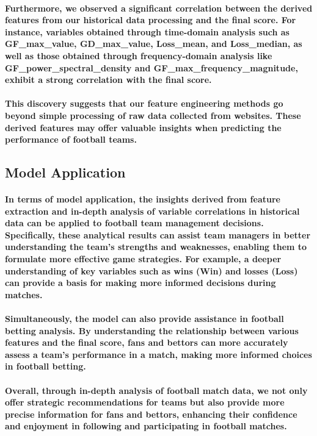 \paragraph{Furthermore, we observed a significant correlation between the derived features from our historical data processing and the final score. For instance, variables obtained through time-domain analysis such as GF\_max\_value, GD\_max\_value, Loss\_mean, and Loss\_median, as well as those obtained through frequency-domain analysis like GF\_power\_spectral\_density and GF\_max\_frequency\_magnitude, exhibit a strong correlation with the final score.}
% 
\paragraph{This discovery suggests that our feature engineering methods go beyond simple processing of raw data collected from websites. These derived features may offer valuable insights when predicting the performance of football teams.}
% 
% 
% 
% 
% 
\subsection{Model Application}
\paragraph{In terms of model application, the insights derived from feature extraction and in-depth analysis of variable correlations in historical data can be applied to football team management decisions. Specifically, these analytical results can assist team managers in better understanding the team's strengths and weaknesses, enabling them to formulate more effective game strategies. For example, a deeper understanding of key variables such as wins (Win) and losses (Loss) can provide a basis for making more informed decisions during matches.}
% 
% 
\paragraph{Simultaneously, the model can also provide assistance in football betting analysis. By understanding the relationship between various features and the final score, fans and bettors can more accurately assess a team's performance in a match, making more informed choices in football betting.}
% 
% 
\paragraph{Overall, through in-depth analysis of football match data, we not only offer strategic recommendations for teams but also provide more precise information for fans and bettors, enhancing their confidence and enjoyment in following and participating in football matches.}
